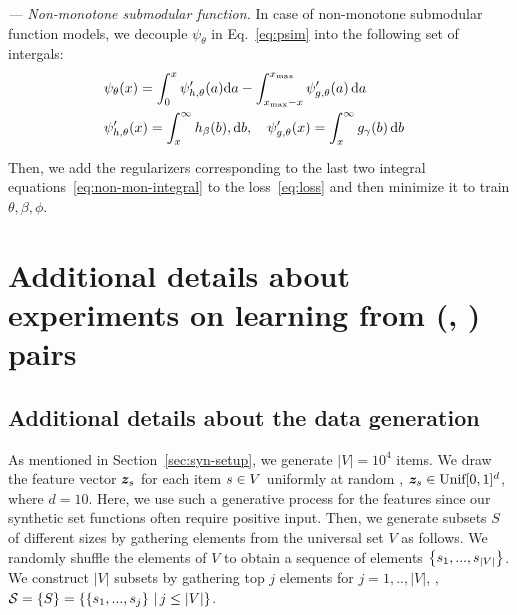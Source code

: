 \documentclass{article}
\newcommand{\ehdr}[1]{\noindent\emph{#1.}}
\def\d{\mathrm{d}}
\begin{document}
\ehdr{--- Non-monotone submodular function} In case of  non-monotone submodular function models, we decouple $\psi_{\theta}$ in Eq.~\eqref{eq:psim} into the following set of intergals:
\begin{align}
&\hspace{-3mm} \psi_{\theta}(x)  = \int_{0} ^{x} \psi' _{h,\theta}(a) \d a - \int_{x_{\max}-x} ^{x_{\max}} \psi' _{g,\theta}(a)  \, \d a \\ 
&\hspace{-3mm} \psi' _{h,\theta}(x)  = \int_{x} ^{\infty} h_{\beta}(b), \d b,\quad 
\psi' _{g,\theta}(x)  = \int_{x} ^{\infty} g_{\gamma}(b) \, \d b \label{eq:non-mon-integral} \\[-3ex]\nn
\end{align}
Then, we add the regularizers corresponding to the last two integral equations~\eqref{eq:non-mon-integral}
to the loss~\eqref{eq:loss} and then minimize it to train $\theta, \beta, \phi$.




\section{Additional  details about experiments on learning from (\tset, \tvalue) pairs}
\label{app:syn}
\subsection{Additional details about the data generation}
As mentioned in Section~\ref{sec:syn-setup}, we generate $|V|=10^4$ items. We draw the feature vector $\bm{z}_s$ for each item $s\in V$ uniformly at random \ie,
$\bm{z}_s\in \text{Unif}[0,1]^{d}$, where $d=10$. Here, we use such a generative process for the features since our synthetic set functions often require positive input. Then, we generate subsets $S$ of different sizes by gathering elements from the universal set $V$ as follows. We randomly shuffle the elements of $V$ to obtain a sequence of elements $\left\{ s_1,...,s_{|V|}\right\}$. 
We construct $|V|$ subsets by gathering top $j$ elements for $j=1,..,|V|$, \ie,
${\mathcal{S}} =\left\{ S\right\} = \left\{ \left\{ s_1,...,s_j\right\}\,|\, j\le |V|\right\}$.  
\end{document}
